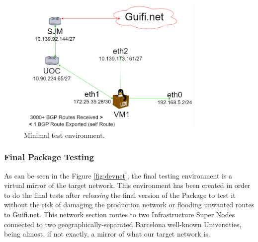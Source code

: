 \begin{figure}[H]
        \centering
        \includegraphics[width=0.8\textwidth]{images/devmin}
        \caption{Minimal test environment.}
        \label{fig:mindev}
	\end{figure}

\subsubsection{Final Package Testing}
\label{sub:sub:fpt}
As can be seen in the Figure \ref{fig:devnet}, the final testing environment is a virtual mirror of the target network. This environment has been created in order to do the final tests after \textit{releasing} the final version of the Package to test it without the risk of damaging the production network or flooding unwanted routes to Guifi.net. This network section routes to two Infrastructure Super Nodes connected to two geographically-separated Barcelona well-known Universities, being almost, if not exactly, a mirror of what our target network is.

